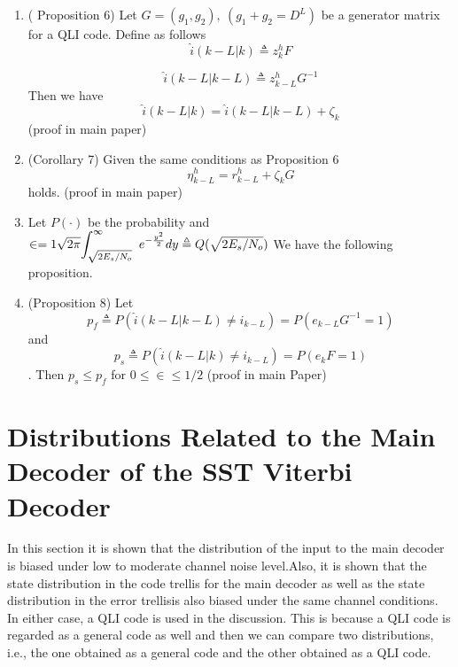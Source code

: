 \documentclass[fontsize=12pt]{article}
\theoremstyle{definition}
\begin{document}
\begin{enumerate}
\item ( Proposition 6) Let $G =(g_1,g_2),~(g_1+g_2=D^L)$ be a
generator matrix for a QLI code. Define as follows
\begin{equation}
\hat{i}(k-L|k) \triangleq z_k^hF
\end{equation}

\begin{equation}
\hat{i}(k-L|k-L) \triangleq z_{k-L}^hG^{-1}
\end{equation}
Then we have 
\begin{equation}
\hat{i}(k-L|k) = \hat{i}(k-L|k-L)+ \zeta_k
\end{equation}
(proof in main paper)

\item (Corollary 7) Given the same conditions as  Proposition 6 $$ \eta_{k-L}^h = r_{k-L}^h + \zeta_kG$$ holds. (proof in main paper)

\item Let $P(\cdot)$ be the probability and $\in = 1\sqrt{2\pi} \mathlarger{\int_{\sqrt{2E_s/N_o}}^{\infty}~e^{-\frac{y^2}{2}}}dy \triangleq Q(\sqrt{2E_s/N_o})$ We have the following proposition.

\item (Proposition 8) Let $$p_f \triangleq P(\hat{i}(k-L|k-L) \neq i_{k-L})=P(e_{k-L}G^{-1} =1)$$ and $$p_s \triangleq P(\hat{i}(k-L|k) \neq i_{k-L})=P(e_{k}F =1)$$. Then $p_s \leq p_f$ for $0\leq \in \leq 1/2$ (proof in main Paper)
\end{enumerate}


\section{Distributions Related to the Main Decoder of the SST Viterbi Decoder}
In this section it is shown that the distribution of the input to the
main decoder is biased under low to moderate channel noise
level.Also, it is shown that the state distribution in the code
trellis for the main decoder as well as the state distribution
in the error trellisis also biased under the same
channel conditions. In either case, a QLI code is used in the
discussion. This is because a QLI code is regarded as a general
code as well and then we can compare two distributions,
i.e., the one obtained as a general code and the other obtained
as a QLI code. 
\end{document}
